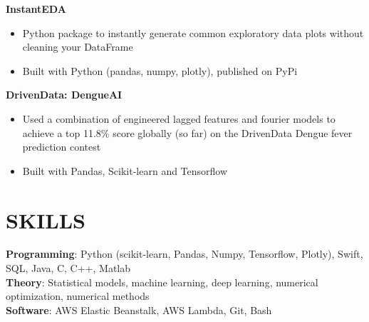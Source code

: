 \documentclass[margin]{res}
\begin{document}
\begin{resume}
    \textbf{InstantEDA}
    \begin{itemize}
        \item Python package to instantly generate common exploratory data plots without cleaning your DataFrame
        \item Built with Python (pandas, numpy, plotly), published on PyPi
    \end{itemize}\vspace*{-8pt}
    \textbf{DrivenData: DengueAI}
    \begin{itemize}
        \item Used a combination of engineered lagged features and fourier models to achieve a top 11.8\% score globally (so far) on the DrivenData Dengue fever prediction contest
        \item Built with Pandas, Scikit-learn and Tensorflow
    \end{itemize}\vspace*{-8pt}
\section{SKILLS}
    \textbf{Programming}: Python (scikit-learn, Pandas, Numpy, Tensorflow, Plotly), Swift, SQL, Java, C, C++, Matlab\\
    \textbf{Theory}: Statistical models, machine learning, deep learning, numerical optimization, numerical methods \\
    \textbf{Software}: AWS Elastic Beanstalk, AWS Lambda, Git, Bash 

\end{resume}
\end{document}
